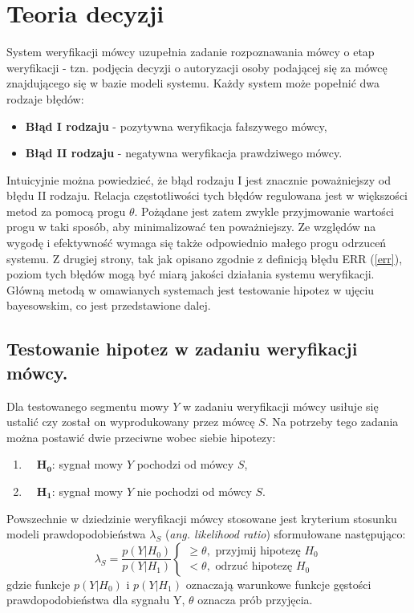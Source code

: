 \section{Teoria decyzji}
\label{verif}

System weryfikacji mówcy uzupełnia zadanie rozpoznawania mówcy o etap weryfikacji - tzn. podjęcia decyzji o autoryzacji osoby podającej się za mówcę znajdującego się w bazie modeli systemu. Każdy system może popełnić dwa rodzaje błędów:
\begin{itemize}
  \item{\textbf{Błąd I rodzaju}} - pozytywna weryfikacja fałszywego mówcy,
  \item{\textbf{Błąd II rodzaju}} - negatywna weryfikacja prawdziwego mówcy.
\end{itemize}
Intuicyjnie można powiedzieć, że błąd rodzaju I jest znacznie poważniejszy od błędu II rodzaju. Relacja częstotliwości tych błędów regulowana jest w większości metod za pomocą progu $\theta$. Pożądane jest zatem zwykle przyjmowanie wartości progu w taki sposób, aby minimalizować ten poważniejszy. Ze względów na wygodę i efektywność wymaga się także odpowiednio małego progu odrzuceń systemu. Z drugiej strony, tak jak opisano zgodnie z definicją błędu ERR (\ref{err}), poziom tych błędów mogą być miarą jakości działania systemu weryfikacji. Główną metodą w omawianych systemach jest testowanie hipotez w ujęciu bayesowskim, co jest przedstawione dalej.  

\subsection{Testowanie hipotez w zadaniu weryfikacji mówcy.}

Dla testowanego segmentu mowy $Y$ w zadaniu weryfikacji mówcy usiłuje się ustalić czy został on wyprodukowany przez mówcę $S$. Na potrzeby tego zadania można postawić dwie przeciwne wobec siebie hipotezy:
\begin{enumerate}
  \item{$\quad\bm{H_0}$}: sygnał mowy $Y$ pochodzi od mówcy $S$,
  \item{$\quad\bm{H_1}$}: sygnał mowy $Y$ nie pochodzi od mówcy $S$.
\end{enumerate}
Powszechnie w dziedzinie weryfikacji mówcy stosowane jest kryterium stosunku modeli prawdopodobieństwa $\lambda_S$ (\textit{ang. likelihood ratio}) sformułowane następująco:
\begin{equation}
  \label{likratio}
  \lambda_S = \frac{p(Y|H_0)}{p(Y|H_1)}
  \begin{cases}
    \ge \theta, \textrm{ przyjmij hipotezę } H_0 \\
    < \theta, \textrm{ odrzuć hipotezę } H_0
  \end{cases}
\end{equation}
gdzie funkcje $p(Y|H_0)$ i $p(Y|H_1)$ oznaczają warunkowe funkcje gęstości prawdopodobieństwa dla sygnału Y, $\theta$ oznacza prób przyjęcia. 

